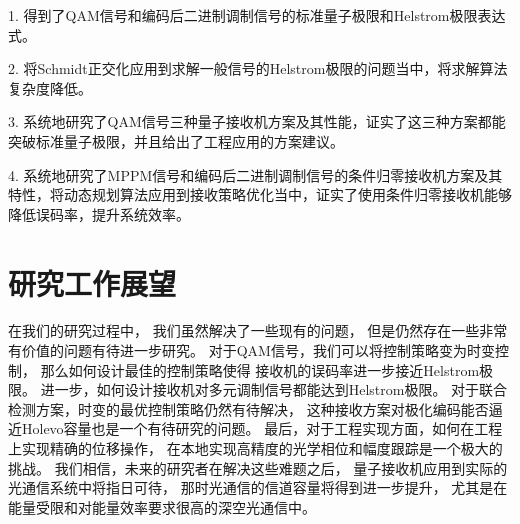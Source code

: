 1. 得到了QAM信号和编码后二进制调制信号的标准量子极限和Helstrom极限表达式。

2. 将Schmidt正交化应用到求解一般信号的Helstrom极限的问题当中，将求解算法复杂度降低。

3. 系统地研究了QAM信号三种量子接收机方案及其性能，证实了这三种方案都能突破标准量子极限，并且给出了工程应用的方案建议。

4. 系统地研究了MPPM信号和编码后二进制调制信号的条件归零接收机方案及其特性，将动态规划算法应用到接收策略优化当中，证实了使用条件归零接收机能够降低误码率，提升系统效率。


\section{研究工作展望}
在我们的研究过程中，
我们虽然解决了一些现有的问题，
但是仍然存在一些非常有价值的问题有待进一步研究。
对于QAM信号，我们可以将控制策略变为时变控制，
那么如何设计最佳的控制策略使得
接收机的误码率进一步接近Helstrom极限。
进一步，如何设计接收机对多元调制信号都能达到Helstrom极限。
对于联合检测方案，时变的最优控制策略仍然有待解决，
这种接收方案对极化编码能否逼近Holevo容量也是一个有待研究的问题。
最后，对于工程实现方面，如何在工程上实现精确的位移操作，
在本地实现高精度的光学相位和幅度跟踪是一个极大的挑战。
我们相信，未来的研究者在解决这些难题之后，
量子接收机应用到实际的光通信系统中将指日可待，
那时光通信的信道容量将得到进一步提升，
尤其是在能量受限和对能量效率要求很高的深空光通信中。


